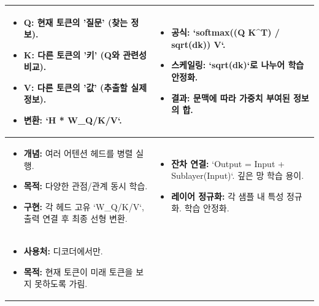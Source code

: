 \documentclass[11pt,a4paper]{article}
\begin{document}
\begin{adjustbox}{width=\textwidth,center}
\begin{tabular}{p{}p{}}
\midrule
\begin{conceptbox}[title={Q, K, V (Query, Key, Value)}]
\begin{itemize}
    \item \textbf{Q:} 현재 토큰의 '질문' (찾는 정보).
    \item \textbf{K:} 다른 토큰의 '키' (Q와 관련성 비교).
    \item \textbf{V:} 다른 토큰의 '값' (추출할 실제 정보).
    \item \textbf{변환:} `H * W_Q/K/V`.
\end{itemize}
\end{conceptbox}
&
\begin{conceptbox}[title={스케일드 닷-프로덕트 어텐션}]
\begin{itemize}
    \item \textbf{공식:} `softmax((Q K^T) / sqrt(dk)) V`.
    \item \textbf{스케일링:} `sqrt(dk)`로 나누어 학습 안정화.
    \item \textbf{결과:} 문맥에 따라 가중치 부여된 정보의 합.
\end{itemize}
\end{conceptbox} \\
\midrule
\begin{conceptbox}[title={멀티 헤드 어텐션}]
\begin{itemize}
    \item \textbf{개념:} 여러 어텐션 헤드를 병렬 실행.
    \item \textbf{목적:} 다양한 관점/관계 동시 학습.
    \item \textbf{구현:} 각 헤드 고유 `W_Q/K/V`, 출력 연결 후 최종 선형 변환.
\end{itemize}
\end{conceptbox}
&
\begin{conceptbox}[title={잔차 연결 및 정규화}]
\begin{itemize}
    \item \textbf{잔차 연결:} `Output = Input + Sublayer(Input)`. 깊은 망 학습 용이.
    \item \textbf{레이어 정규화:} 각 샘플 내 특성 정규화. 학습 안정화.
\end{itemize}
\end{conceptbox} \\
\midrule
\begin{conceptbox}[title={마스크드 어텐션}]
\begin{itemize}
    \item \textbf{사용처:} 디코더에서만.
    \item \textbf{목적:} 현재 토큰이 미래 토큰을 보지 못하도록 가림.

\end{itemize}
\end{conceptbox}
\end{tabular}
\end{adjustbox}
\end{document}
